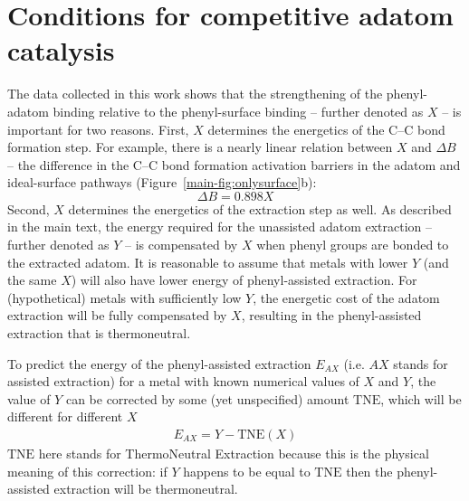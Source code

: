 \documentclass[aps,prl,reprint,amsmath,amssymb,floatfix,notitlepage]{revtex4-1}
\begin{document}
\section{Conditions for competitive adatom catalysis}


The data collected in this work shows that the strengthening of the phenyl-adatom binding relative to the phenyl-surface binding -- further denoted as $X$ -- is important for two reasons. First, $X$ determines the energetics of the C--C bond formation step. For example, there is a nearly linear relation between $X$ and $\Delta B$ -- the difference in the C--C bond formation activation barriers in the adatom and ideal-surface pathways (Figure~\ref{main-fig:onlysurface}b):
% 
\begin{equation} \label{eq:relation1}
\Delta B = 0.898 X
\end{equation}
%
Second, $X$ determines the energetics of the extraction step as well. As described in the main text, the energy required for the unassisted adatom extraction -- further denoted as $Y$ -- is compensated by $X$ when phenyl groups are bonded to the extracted adatom. It is reasonable to assume that metals with lower $Y$ (and the same $X$) will also have lower energy of phenyl-assisted extraction. For (hypothetical) metals with sufficiently low $Y$, the energetic cost of the adatom extraction will be fully compensated by $X$, resulting in the phenyl-assisted extraction that is thermoneutral. 

To predict the energy of the phenyl-assisted extraction $E_{AX}$ (i.e. $AX$ stands for assisted extraction) for a metal with known numerical values of $X$ and $Y$, the value of $Y$ can be corrected by some (yet unspecified) amount $\text{TNE}$, which will be different for different $X$
%
\begin{equation} \label{eq:relation2}
\begin{split}
E_{AX} = Y - \text{TNE}(X)
\end{split}
\end{equation}
%
$\text{TNE}$ here stands for ThermoNeutral Extraction because this is the physical meaning of this correction: if $Y$ happens to be equal to $\text{TNE}$ then the phenyl-assisted extraction will be thermoneutral.
\end{document}
